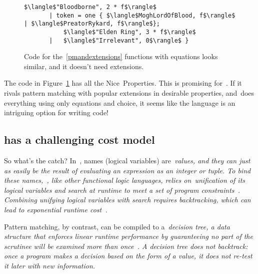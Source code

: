 \documentclass[manuscript,screen 12pt, nonacm]{acmart}
\begin{document}
\begin{figure}[ht]
\begin{minipage}[h]{\linewidth}
\begin{lstlisting}[numbers=none, basicstyle=\tiny, xleftmargin=9em, 
                            frame=single, showstringspaces=false]
           $\langle$"Bloodborne", 2 * f$\rangle$
       | token = one { $\langle$MoghLordOfBlood, f$\rangle$ | $\langle$PreatorRykard, f$\rangle$}; 
           $\langle$"Elden Ring", 3 * f$\rangle$
       |   $\langle$"Irrelevant", 0$\rangle$ }
          \end{lstlisting}
            \label{fig:versegot} 
        \vspace{4ex}
        \end{minipage}%
    \caption{Code for the~\ref{pmandextensions} functions with equations looks
    similar, and it doesn't need extensions.}
    \label{fig:verseextfuncs}
      \end{figure}
        
    The code in Figure~\ref{fig:verseextfuncs} has all the Nice~Properties. This
    is promising for~\VC. If it rivals pattern matching with popular extensions
    in desirable properties, and~\VC does everything using only equations and
    choice, it seems like the language is an intriguing option for writing code! 

    \subsection{\VC has a challenging cost model}
    \label{vcbadcost}

    So what's the catch? In~\VC, names (logical variables) are~\it{values}, and
    they can just as easily be the result of evaluating an expression as an
    integer or tuple. To bind these names,~\VC, like other functional logic
    languages, relies on~\it{unification} of its logical variables and
    \it{search} at runtime to meet a set of program
    constraints~\citep{antoy2010functional, hanus2013functional}. Combining
    unifying logical variables with search requires backtracking, which can lead
    to exponential runtime cost~\citep{hanus2013functional, wadler1985replace,
    clark1982introduction}. 


    Pattern matching, by contrast, can be compiled to a~\it{decision tree}, a
    data structure that enforces linear runtime performance by guaranteeing no
    part of the scrutinee will be examined more than once~\citep{maranget}. A
    decision tree does not backtrack: once a program makes a decision based on
    the form of a value, it does not re-test it later with new information. 
    
\end{document}
